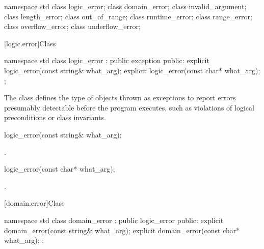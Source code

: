 \begin{codeblock}
namespace std {
  class logic_error;
    class domain_error;
    class invalid_argument;
    class length_error;
    class out_of_range;
  class runtime_error;
    class range_error;
    class overflow_error;
    class underflow_error;
}
\end{codeblock}

[logic.error]{Class }

%
\begin{codeblock}
namespace std {
  class logic_error : public exception {
  public:
    explicit logic_error(const string& what_arg);
    explicit logic_error(const char* what_arg);
  };
}
\end{codeblock}

\pnum
The class
defines the type of objects thrown as
exceptions to report errors presumably detectable before
the program executes, such as violations of logical preconditions or class
invariants.

%
\begin{itemdecl}
logic_error(const string& what_arg);
\end{itemdecl}

\begin{itemdescr}

\pnum
\ensures
{}.
\end{itemdescr}

%
\begin{itemdecl}
logic_error(const char* what_arg);
\end{itemdecl}

\begin{itemdescr}

\pnum
\ensures
{}.
\end{itemdescr}

[domain.error]{Class }

%
\begin{codeblock}
namespace std {
  class domain_error : public logic_error {
  public:
    explicit domain_error(const string& what_arg);
    explicit domain_error(const char* what_arg);
  };
}
\end{codeblock}


